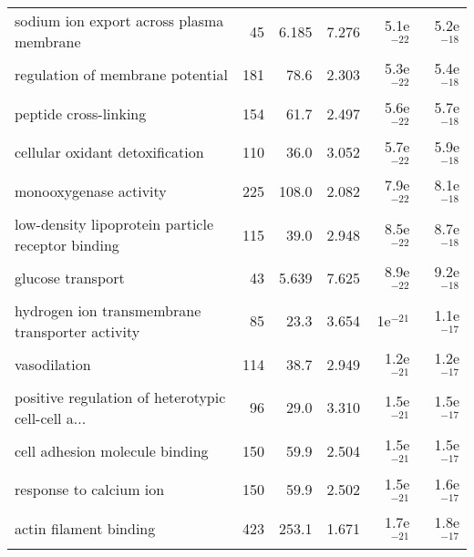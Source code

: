 \begin{longtable}{lrrrrr}
          sodium ion export across plasma membrane &                      45 &                   6.185 &      7.276 &         5.1e$^{-22}$ &         5.2e$^{-18}$ \\
                  regulation of membrane potential &                     181 &                    78.6 &      2.303 &         5.3e$^{-22}$ &         5.4e$^{-18}$ \\
                             peptide cross-linking &                     154 &                    61.7 &      2.497 &         5.6e$^{-22}$ &         5.7e$^{-18}$ \\
                   cellular oxidant detoxification &                     110 &                    36.0 &      3.052 &         5.7e$^{-22}$ &         5.9e$^{-18}$ \\
                            monooxygenase activity &                     225 &                   108.0 &      2.082 &         7.9e$^{-22}$ &         8.1e$^{-18}$ \\
 low-density lipoprotein particle receptor binding &                     115 &                    39.0 &      2.948 &         8.5e$^{-22}$ &         8.7e$^{-18}$ \\
                                 glucose transport &                      43 &                   5.639 &      7.625 &         8.9e$^{-22}$ &         9.2e$^{-18}$ \\
   hydrogen ion transmembrane transporter activity &                      85 &                    23.3 &      3.654 &           1e$^{-21}$ &         1.1e$^{-17}$ \\
                                      vasodilation &                     114 &                    38.7 &      2.949 &         1.2e$^{-21}$ &         1.2e$^{-17}$ \\
 positive regulation of heterotypic cell-cell a... &                      96 &                    29.0 &      3.310 &         1.5e$^{-21}$ &         1.5e$^{-17}$ \\
                    cell adhesion molecule binding &                     150 &                    59.9 &      2.504 &         1.5e$^{-21}$ &         1.5e$^{-17}$ \\
                           response to calcium ion &                     150 &                    59.9 &      2.502 &         1.5e$^{-21}$ &         1.6e$^{-17}$ \\
                            actin filament binding &                     423 &                   253.1 &      1.671 &         1.7e$^{-21}$ &         1.8e$^{-17}$ \\

\end{longtable}
